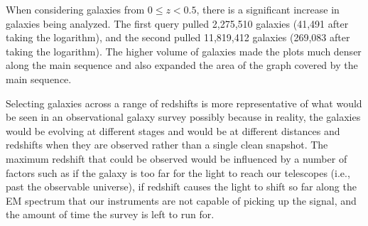 \documentclass[12pt]{article}
\begin{document}
When considering galaxies from $0 \leq z < 0.5$, there is a significant increase in galaxies being analyzed.  The first query pulled 2,275,510 galaxies (41,491 after taking the logarithm), and the second pulled 11,819,412 galaxies (269,083 after taking the logarithm).  The higher volume of galaxies made the plots much denser along the main sequence and also expanded the area of the graph covered by the main sequence.  

Selecting galaxies across a range of redshifts is more representative of what would be seen in an observational galaxy survey possibly because in reality, the galaxies would be evolving at different stages and would be at different distances and redshifts when they are observed rather than a single clean snapshot.  The maximum redshift that could be observed would be influenced by a number of factors such as if the galaxy is too far for the light to reach our telescopes (i.e., past the observable universe), if redshift causes the light to shift so far along the EM spectrum that our instruments are not capable of picking up the signal, and the amount of time the survey is left to run for.  

\clearpage
\printbibliography
\end{document}
